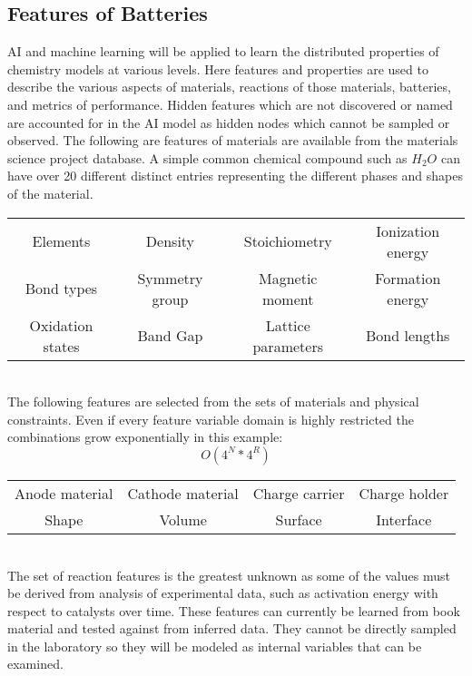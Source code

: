 \documentclass[10pt]{article}
\begin{document}
\subsection{Features of Batteries}
AI and machine learning will be applied to learn the distributed properties of chemistry models at various levels. Here features and properties are used to describe the various aspects of materials, reactions of those materials, batteries, and metrics of performance. Hidden features which are not discovered or named are accounted for in the AI model as hidden nodes which cannot be sampled or observed. The following are features of materials are available from the materials science project database. A simple common chemical compound such as $H_2O$ can have over 20 different distinct entries representing the different phases and shapes of the material. \\

\noindent
\begin{tabular}{|c c c c|}
	\hline
	Elements & Density & Stoichiometry & Ionization energy\\
	Bond types & Symmetry group & Magnetic moment & Formation energy\\
	Oxidation states & Band Gap & Lattice parameters & Bond lengths\\
	\hline
\end{tabular}\\

The following features are selected from the sets of materials and physical constraints. Even if every feature variable domain is highly restricted the combinations grow exponentially in this example: $$O(4^N*4^R)$$
\noindent
\begin{tabular}{| c c c c|}
	\hline
	Anode material & Cathode material & Charge carrier & Charge holder \\
	Shape & Volume & Surface & Interface \\ 
	\hline
\end{tabular}\\

The set of reaction features is the greatest unknown as some of the values must be derived from analysis of experimental data, such as activation energy with respect to catalysts over time. These features can currently be learned from book material and tested against from inferred data. They cannot be directly sampled in the laboratory so they will be modeled as internal variables that can be examined.\\
 
\end{document}
